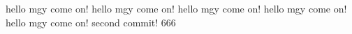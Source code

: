 hello mgy  come on!
hello mgy  come on!
hello mgy  come on!
hello mgy  come on!
hello mgy  come on!
second commit!  666
